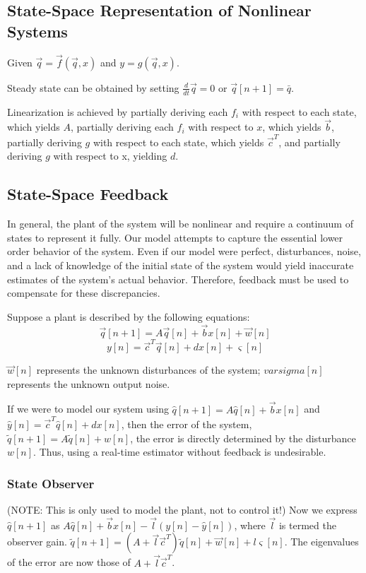 \documentclass[8pt]{extarticle}
\begin{document}
\begin{multicols*}{3}
\begin{center}
\subsection{State-Space Representation of Nonlinear Systems}
Given \( \vec{q} = \vec{f}(\vec{q}, x) \) and \( y = g(\vec{q}, x) \).

Steady state can be obtained by setting \( \frac{d}{dt} \vec{q} = 0 \) or \( \vec{q}[n+1] = \bar{q} \).

Linearization is achieved by partially deriving each \( f_i \) with respect to each state, which yields \( A \), partially deriving each \( f_i \) with respect to \( x \), which yields \( \vec{b} \), partially deriving \( g \) with respect to each state, which yields \( \vec{c}^{T} \), and partially deriving \( g \) with respect to x, yielding \( d \).

\subsection{State-Space Feedback}
In general, the plant of the system will be nonlinear and require a continuum of states to represent it fully. Our model attempts to capture the essential lower order behavior of the system. Even if our model were perfect, disturbances, noise, and a lack of knowledge of the initial state of the system would yield inaccurate estimates of the system's actual behavior. Therefore, feedback must be used to compensate for these discrepancies.

Suppose a plant is described by the following equations:
\[ \vec{q}[n+1] = A\vec{q}[n] + \vec{b}x[n] + \vec{w}[n] \]
\[ y[n] = \vec{c}^{T}\vec{q}[n] + dx[n] + \varsigma[n] \]

\( \vec{w}[n] \) represents the unknown disturbances of the system; \( varsigma[n] \) represents the unknown output noise.

If we were to model our system using \( \hat{q}[n+1] = A\hat{q}[n] + \vec{b}x[n] \) and \( \hat{y}[n] = \vec{c}^T \hat{q}[n] + dx[n] \), then the error of the system, \( \tilde{q}[n+1] = A\tilde{q}[n] + w[n] \), the error is directly determined by the disturbance \( w[n] \). Thus, using a real-time estimator without feedback is undesirable.

\subsubsection{State Observer}
(NOTE: This is only used to model the plant, not to control it!) Now we express \( \hat{q}[n+1] \) as \( A\hat{q}[n] + \vec{b}x[n] - \vec{l}(y[n]-\hat{y}[n])\), where \( \vec{l} \) is termed the observer gain. \( \tilde{q}[n+1] = (A + \vec{l}\vec{c}^T)\tilde{q}[n] + \vec{w}[n] + l\varsigma[n] \). The eigenvalues of the error are now those of \( A + \vec{l}\vec{c}^T \).


\end{center}
\end{multicols*}
\end{document}
